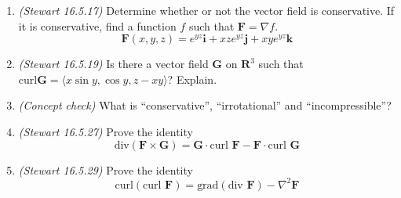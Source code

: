 \documentclass{article}
\newcommand{\ii}{\mathbf{i}}
\newcommand{\jj}{\mathbf{j}}
\newcommand{\kk}{\mathbf{k}}
\begin{document}
\begin{enumerate}
\item {\em (Stewart 16.5.17)} Determine whether or not the vector field is conservative. If it is conservative, find a function $f$ such that $\mathbf{F} = \nabla f$.
\[
\mathbf{F}(x, y, z) = e^{yz} \ii + xz e^{yz} \jj + xy e^{yz} \kk
\]

\item {\em (Stewart 16.5.19)} Is there a vector field $\mathbf{G}$ on $\mathbf{R}^3$ such that $\text{curl} \mathbf{G} = \langle x \sin y, \cos y, z - xy \rangle$? Explain.

\item {\em (Concept check)} What is ``conservative'', ``irrotational'' and ``incompressible''?

\item {\em (Stewart 16.5.27)} Prove the identity
\[
\text{div}(\mathbf{F} \times \mathbf{G}) = \mathbf{G} \cdot \text{curl } \mathbf{F} - \mathbf{F} \cdot \text{curl } \mathbf{G}
\]

\item {\em (Stewart 16.5.29)} Prove the identity
\[
\text{curl}(\text{curl }\mathbf{F}) = \text{grad}(\text{div }\mathbf{F}) - \nabla^2 \mathbf{F}
\]
\end{enumerate}
\end{document}
